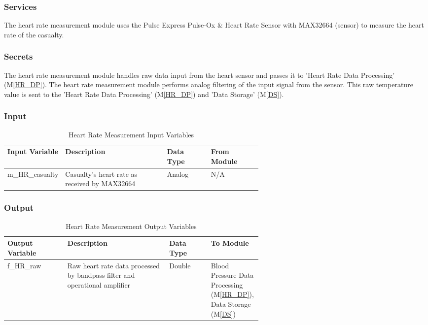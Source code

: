 \documentclass{article}
\begin{document}
\begin{description}
        \subsubsection{Services}
        The heart rate measurement module uses the Pulse Express Pulse-Ox \& Heart Rate Sensor with MAX32664 (sensor) to measure the heart rate of the casualty.
        \subsubsection{Secrets}
        The heart rate measurement module handles raw data input from the heart sensor and passes it to 'Heart Rate Data Processing' (M\ref{HR_DP}). The heart rate measurement module performs analog filtering of the input signal from the sensor. This raw temperature value is sent to the 'Heart Rate Data Processing' (M\ref{HR_DP}) and 'Data Storage' (M\ref{DS}).
    
        \subsubsection{Input}
            \begin{longtable}{|l|p{0.4\linewidth}|l|p{0.2\linewidth}|}
            \caption{Heart Rate Measurement Input Variables}
            \hline
            \textbf{Input Variable} & \textbf{Description} & \textbf {Data Type} & \textbf{From Module} \\
            \endhead
            \hline
            m\_HR\_casualty & Casualty's heart rate as received by MAX32664 & Analog & N/A \\
            \hline
            \end{longtable}
        \newpage
        \subsubsection{Output}
            \begin{longtable}{|l|p{0.4\linewidth}|l|p{0.2\linewidth}|}
            \caption{Heart Rate Measurement Output Variables}
            \hline
            \textbf{Output Variable} & \textbf{Description} & \textbf {Data Type} & \textbf{To Module} \\
            \endhead
            \hline
            f\_HR\_raw &  Raw heart rate data processed by bandpass filter and operational amplifier & Double & Blood Pressure Data Processing (M\ref{HR_DP}), Data Storage (M\ref{DS})\\
            \hline
            \end{longtable}

\end{description}
\end{document}
